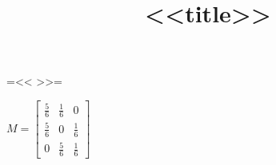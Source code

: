 \documentclass{article}
\begin{document}
{{=<< >>=}}

\title{<<title>>}
\maketitle

$
M = \begin{bmatrix}
       \frac{5}{6} & \frac{1}{6} & 0           \\[0.3em]
       \frac{5}{6} & 0           & \frac{1}{6} \\[0.3em]
       0           & \frac{5}{6} & \frac{1}{6}
     \end{bmatrix}
$
\end{document}
